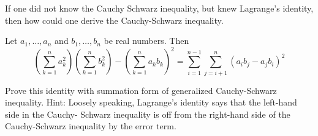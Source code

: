     \begin{exercise}
        If one did not know the Cauchy Schwarz inequality, but knew Lagrange's identity, then how could one derive the Cauchy-Schwarz inequality.
        \begin{theorem}
            Let \( a_1, \ldots, a_n \) and \( b_1, \ldots, b_n \) be real numbers. Then
            \[
                \left(\sum_{k=1}^{n} a_{k}^{2}\right)\left(\sum_{k=1}^{n} b_{k}^{2}\right)-\left(\sum_{k=1}^{n} a_{k} b_{k}\right)^{2}=\sum_{i=1}^{n-1} \sum_{j=i+1}^{n}\left(a_{i} b_{j}-a_{j} b_{i}\right)^{2}
\]
        \end{theorem}
        Prove this identity with summation form of generalized Cauchy-Schwarz inequality. Hint: Loosely speaking, Lagrange's identity says that the left-hand side in the Cauchy-
        Schwarz inequality is off from the right-hand side of the Cauchy-Schwarz inequality
        by the error term.
    \end{exercise}
